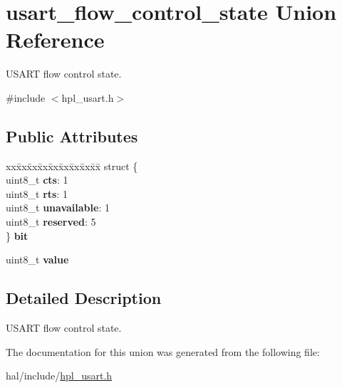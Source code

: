 \hypertarget{unionusart__flow__control__state}{}\section{usart\+\_\+flow\+\_\+control\+\_\+state Union Reference}
\label{unionusart__flow__control__state}


U\+S\+A\+RT flow control state.  




{\ttfamily \#include $<$hpl\+\_\+usart.\+h$>$}

\subsection*{Public Attributes}
\begin{DoxyCompactItemize}
\item 
\mbox{\label{unionusart__flow__control__state_a6ade7bab5cb48566816f4e6d6c429839}} 
\begin{tabbing}
xx\=xx\=xx\=xx\=xx\=xx\=xx\=xx\=xx\=\kill
struct \{\\
\>uint8\_t {\bfseries cts}: 1\\
\>uint8\_t {\bfseries rts}: 1\\
\>uint8\_t {\bfseries unavailable}: 1\\
\>uint8\_t {\bfseries reserved}: 5\\
\} {\bfseries bit}\\

\end{tabbing}\item 
\mbox{\label{unionusart__flow__control__state_a89fd17179ea28972111f4e5822de3e4e}} 
uint8\+\_\+t {\bfseries value}
\end{DoxyCompactItemize}


\subsection{Detailed Description}
U\+S\+A\+RT flow control state. 

The documentation for this union was generated from the following file\+:\begin{DoxyCompactItemize}
\item 
hal/include/\hyperlink{hpl__usart_8h}{hpl\+\_\+usart.\+h}\end{DoxyCompactItemize}
